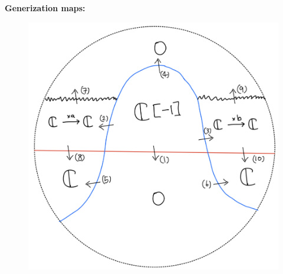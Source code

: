 \textbf{Generization maps:}
\begin{figure}[H]
    \centering
    \includegraphics[scale = 0.45]{diagrams/lemma2/29.png} 
    \caption{}
    \label{fig:your-label}
\end{figure}
